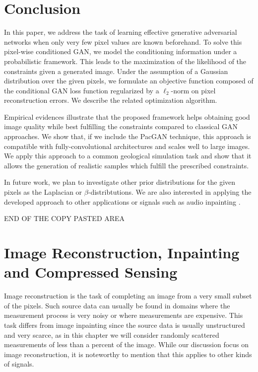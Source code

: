 \section*{Conclusion}
In this paper, we address the task of learning effective generative adversarial networks when only very few pixel values are known beforehand. To solve this pixel-wise conditioned GAN, we model the conditioning information under a probabilistic framework. This leads to the maximization of the likelihood of the constraints given a
generated image. Under the assumption of a Gaussian distribution over the given pixels, we formulate an objective function composed of the conditional GAN loss function regularized by a $\ell_2$-norm on pixel reconstruction errors. We describe the related optimization algorithm.

Empirical evidences illustrate that the proposed framework helps obtaining good image quality while best fulfilling the constraints compared to classical GAN approaches. We show that, if we include the PacGAN technique,  this  approach  is  compatible  with  fully-convolutional  architectures  and scales well to large images. We apply this approach to a common geological simulation task and show that it allows the generation of realistic samples which fulfill the prescribed constraints.

In future work, we plan to investigate other prior distributions for the given pixels as the Laplacian or $\beta$-distribtutions. We are also interested in applying the developed approach to other applications or signals such as audio inpainting \citep{Marafioti2018}.



{\Huge END OF THE COPY PASTED AREA}


 \section{Image Reconstruction, Inpainting and Compressed Sensing}

Image reconstruction is the task of completing an image from a very small subset of the pixels. Such source data can usually be found in domains where the measurement process is very noisy or where measurements are expensive. This task differs from image inpainting since the source data is usually unstructured and very scarce, as in this chapter we will consider randomly scattered measurements of less than a percent of the image. While our discussion focus on image reconstruction, it is noteworthy to mention that this applies to other kinds of signals.

